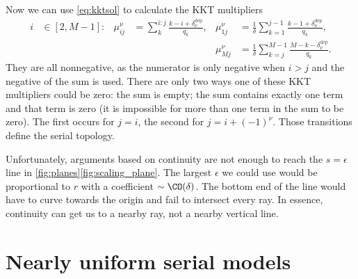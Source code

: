\documentclass[12pt]{article}
\newcommand{\kktm}{\mu}
\newcommand{\dep}{^{\text{dep}}}
\begin{document}
%
Now we can use \cref{eq:kktsol} to calculate the KKT multipliers
%
\begin{equation}\label{eq:areaKKT}
\begin{aligned}
    i &\in [2, M-1]: &
    \kktm^\nu_{ij} &= \sum_k^{i:j} \frac{k - i + \delta\dep_\nu}{q_k}, &
    \kktm^\nu_{1j} &= \frac{1}{\delta} \sum_{k=1}^{j-1} \frac{k - 1 + \delta\dep_\nu}{q_k},
      \\ &&&&
    \kktm^\nu_{Mj} &= \frac{1}{\delta} \sum_{k=j}^{M-1} \frac{M - k - \delta\dep_\nu}{q_k}.
\end{aligned}
\end{equation}
%
They are all nonnegative, as the numerator is only negative when \(i > j\) and the negative of the sum is used.
There are only two ways one of these KKT multipliers could be zero: 
the sum is empty; 
the sum contains exactly one term and that term is zero
(it is impossible for more than one term in the sum to be zero).
The first occurs for \(j = i\), the second for \( j = i + (-1)^\nu \).
Those transitions define the serial topology.

Unfortunately, arguments based on continuity are not enough to reach the \(s=\epsilon\) line in \cref{fig:planes}\ref{fig:scaling_plane}.
The largest \(\epsilon\) we could use would be proportional to \(r\) with a coefficient \( \sim \CO(\delta) \).
The bottom end of the line would have to curve towards the origin and fail to intersect every ray.
In essence, continuity can get us to a nearby ray, not a nearby vertical line.



\section{Nearly uniform serial models}\label{sec:serial}
\end{document}
